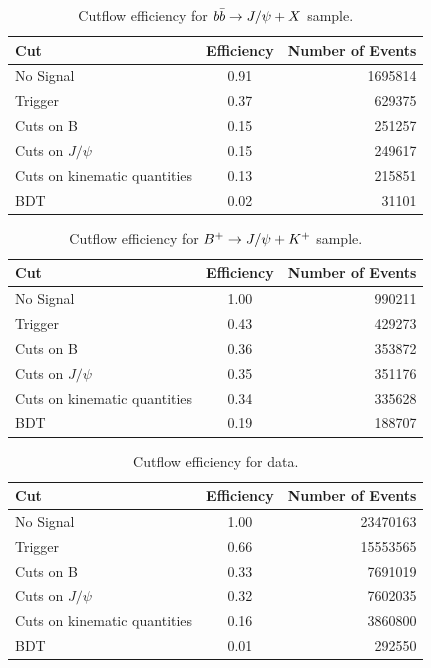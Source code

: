 \begin{table}[ht]
    \centering
    \begin{tabular}{| l | c | r |}
	\hline
	Cut   & Efficiency & Number of Events\\ 
	\hline
	No Signal & 0.91 & 1695814\\ 
	Trigger & 0.37 & 629375\\ 
	Cuts on B & 0.15 & 251257\\ 
	Cuts on $J/\psi$ & 0.15 & 249617\\ 
	Cuts on kinematic quantities & 0.13 & 215851\\ 
	BDT & 0.02 & 31101\\ 
	\hline
    \end{tabular}
    \caption{Cutflow efficiency for $b\bar{b}\rightarrow J/\psi+X$ sample.}
    \label{tbl:bplus_cutflow_eff_background}
\end{table}

\begin{table}[ht]
    \centering
    \begin{tabular}{| l | c | r |}
	\hline
	Cut   & Efficiency & Number of Events\\ 
	\hline
	No Signal & 1.00 & 990211\\ 
	Trigger & 0.43 & 429273\\ 
	Cuts on B & 0.36 & 353872\\ 
	Cuts on $J/\psi$ & 0.35 & 351176\\ 
	Cuts on kinematic quantities & 0.34 & 335628\\ 
	BDT & 0.19 & 188707\\ 
	\hline
    \end{tabular}
    \caption{Cutflow efficiency for $B^{+}\rightarrow J/\psi+K^{+}$ sample.}
    \label{tbl:bplus_cutflow_eff_signal}
\end{table}

\begin{table}[ht]
    \centering
    \begin{tabular}{| l | c | r |}
	\hline
	Cut   & Efficiency & Number of Events\\ 
	\hline
	No Signal & 1.00 & 23470163\\ 
	Trigger & 0.66 & 15553565\\ 
	Cuts on B & 0.33 & 7691019\\ 
	Cuts on $J/\psi$ & 0.32 & 7602035\\ 
	Cuts on kinematic quantities & 0.16 & 3860800\\ 
	BDT & 0.01 & 292550\\ 
	\hline
    \end{tabular}
    \caption{Cutflow efficiency for data.}
    \label{tbl:bplus_cutflow_eff_data}
\end{table}

